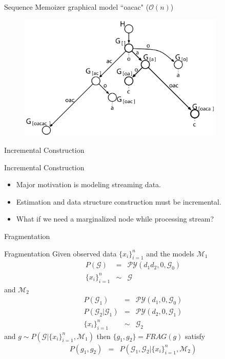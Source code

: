 \documentclass{beamer}
\newcommand{\G}{\mathcal{G}}
\newcommand{\PY}{\mathcal{P}\mathcal{Y}}
\begin{document}
\begin{frame}[t]{Sequence Memoizer graphical model ``oacac" ($\mathcal{O}(n)$) \cite{Wood2009}}

	\begin{figure}[t]
		\begin{center}
			\includegraphics[height = 6cm]{../figs/prefix_tree_not_coloured.pdf}
		\end{center}
	\end{figure}
	
\end{frame}

\begin{frame}[t]{Incremental Construction}
	\begin{block}{Incremental Construction}
		\begin{itemize}
			\item Major motivation is modeling streaming data.
			\item Estimation and data structure construction must be incremental.
			\item What if we need a marginalized node while processing stream?
		\end{itemize}
	\end{block}
\end{frame}

\begin{frame}[t] {Fragmentation}

	\begin{block}{Fragmentation \cite{Pitman1999, Wood2009}}
		Given observed data $\{x_i\}_{i = 1}^n$ and the models $\mathcal{M}_1$ 
		\begin{eqnarray*}
			P(\G) &=& \PY(d_1 d_2, 0, \G_0)\\
			\{x_i\}_{i = 1}^n &\sim& \G
		\end{eqnarray*}
		and $\mathcal{M}_2$
		\begin{eqnarray*}
			P(\G_1) &=& \PY(d_1, 0, \G_0)\\
			P(\G_2 | \G_1) &=& \PY(d_2, 0, \G_1)\\
			\{x_i\}_{i = 1}^n &\sim& \G_2
		\end{eqnarray*}
      	and $g \sim P(\G | \{x_i \}_{i = 1}^n, \mathcal{M}_1)$ then $\{g_1, g_2\}  = FRAG(g)$ satisfy
		\begin{eqnarray*}
			P(g_1, g_2) &=& P(\G_1, \G_2 |  \{x_i\}_{i = 1}^n, \mathcal{M}_2)
		\end{eqnarray*}
	\end{block}

\end{frame}
\end{document}
